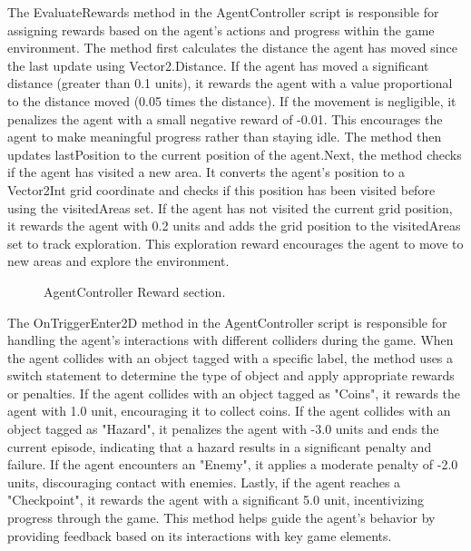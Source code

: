\documentclass[12pt,oneside,openright,a4paper]{cpe-english-project}
\begin{document}
The EvaluateRewards method in the AgentController script is responsible for assigning rewards based on the agent's actions and progress within the game environment. The method first calculates the distance the agent has moved since the last update using Vector2.Distance. If the agent has moved a significant distance (greater than 0.1 units), it rewards the agent with a value proportional to the distance moved (0.05 times the distance). If the movement is negligible, it penalizes the agent with a small negative reward of -0.01. This encourages the agent to make meaningful progress rather than staying idle. The method then updates lastPosition to the current position of the agent.Next, the method checks if the agent has visited a new area. It converts the agent's position to a Vector2Int grid coordinate and checks if this position has been visited before using the visitedAreas set. If the agent has not visited the current grid position, it rewards the agent with 0.2 units and adds the grid position to the visitedAreas set to track exploration. This exploration reward encourages the agent to move to new areas and explore the environment.\par
 \begin{figure}[!h]
 \centering
\caption{AgentController Reward section.}\label{fig:reward}
\end{figure}
\newpage
The OnTriggerEnter2D method in the AgentController script is responsible for handling the agent's interactions with different colliders during the game. When the agent collides with an object tagged with a specific label, the method uses a switch statement to determine the type of object and apply appropriate rewards or penalties. If the agent collides with an object tagged as "Coins", it rewards the agent with 1.0 unit, encouraging it to collect coins. If the agent collides with an object tagged as "Hazard", it penalizes the agent with -3.0 units and ends the current episode, indicating that a hazard results in a significant penalty and failure. If the agent encounters an "Enemy", it applies a moderate penalty of -2.0 units, discouraging contact with enemies. Lastly, if the agent reaches a "Checkpoint", it rewards the agent with a significant 5.0 unit, incentivizing progress through the game. This method helps guide the agent's behavior by providing feedback based on its interactions with key game elements.\par
\end{document}
